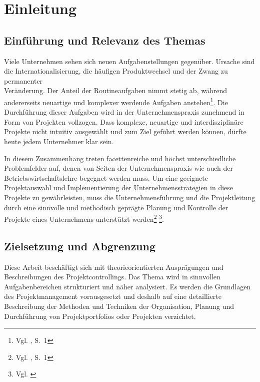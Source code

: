 \section{Einleitung}
\subsection{Einführung und Relevanz des Themas}
Viele Unternehmen sehen sich neuen Aufgabenstellungen gegen{\"u}ber. Ursache sind die Internationalisierung, die h{\"a}ufigen Produktwechsel und der Zwang zu permanenter\\Veränderung. Der Anteil der Routineaufgaben nimmt stetig ab, w{\"a}hrend andererseits neuartige und komplexer werdende Aufgaben anstehen\footnote{Vgl. \cite{Fiedler2008}, S.~1}.
Die Durchführung dieser Aufgaben wird in der Unternehmenspraxis zunehmend in Form von Projekten vollzogen.
Dass komplexe, neuartige und interdisziplinäre Projekte nicht intuitiv ausgewählt und zum Ziel geführt werden können, dürfte heute jedem Unternehmer klar sein.

In diesem Zusammenhang treten facettenreiche und h{\"o}chst unterschiedliche Problemfelder auf, denen von Seiten der Unternehmenspraxis wie auch der Betriebswirtschaftslehre begegnet werden muss. Um eine geeignete Projektauswahl und Implementierung der Unternehmensstrategien in diese Projekte zu gewährleisten, muss die Unternehmensf{\"u}hrung und die Projektleitung durch eine sinnvolle und methodisch gepr{\"a}gte Planung und Kontrolle der Projekte eines Unternehmens unterst{\"u}tzt werden\footnote{Vgl. \cite{Kunz2007}, S.~1} \footnote{Vgl. \cite{Urli&Terrien2010}}.

\subsection{Zielsetzung und Abgrenzung}
Diese Arbeit beschäftigt sich mit theorieorientierten Ausprägungen und Beschreibungen des Projektcontrollings. Das Thema wird in sinnvollen Aufgabenbereichen strukturiert und näher analysiert. Es werden die Grundlagen des Projektmanagement vorausgesetzt und deshalb auf eine detaillierte Beschreibung der Methoden und Techniken der Organisation, Planung und Durchführung von Projektportfolios oder Projekten verzichtet.

